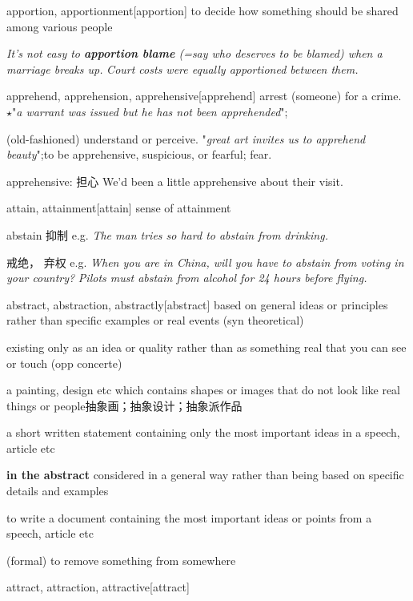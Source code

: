 \begin{word}{apportion, apportionment}[apportion]
    to decide how something should be shared among various people

    \textit{It’s not easy to \textbf{apportion blame} (=say who deserves to be blamed) when a marriage breaks up.}
    \textit{Court costs were equally apportioned between them.}
\end{word}

\begin{word}{apprehend, apprehension, apprehensive}[apprehend]
    arrest (someone) for a crime.
    $\star$"\textit{a warrant was issued but he has not been apprehended}";
    
    (old-fashioned) understand or perceive.
    "\textit{great art invites us to apprehend beauty}";to be apprehensive, suspicious, or fearful; fear.

    apprehensive: 担心 We'd been a little {apprehensive} about their visit.
\end{word}

\begin{word}{attain, attainment}[attain]
    sense of attainment
\end{word}

\begin{word}{abstain}
    抑制
    e.g. \textit{The man tries so hard to abstain from drinking.}
    
    戒绝， 弃权
    e.g. \textit{When you are in China, will you have to abstain from voting in your country?}
    \textit{Pilots must abstain from alcohol for 24 hours before flying.}
\end{word}

\begin{word}{abstract, abstraction, abstractly}[abstract]
    based on general ideas or principles rather than specific examples or real events (syn theoretical)

    existing only as an idea or quality rather than as something real that you can see or touch (opp concerte)

    a painting, design etc which contains shapes or images that do not look like real things or people抽象画；抽象设计；抽象派作品

    a short written statement containing only the most important ideas in a speech, article etc
    
    \textbf{in the abstract} considered in a general way rather than being based on specific details and examples

    to write a document containing the most important ideas or points from a speech, article etc

    (formal) to remove something from somewhere
\end{word}

\begin{word}{attract, attraction, attractive}[attract]
\end{word}